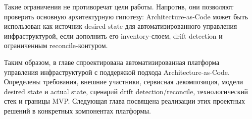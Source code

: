 Такие ограничения не противоречат цели работы. Напротив, они позволяют проверить основную архитектурную гипотезу: Architecture-as-Code может быть использован как источник desired state для автоматизированного управления инфраструктурой, если дополнить его inventory-слоем, drift detection и ограниченным reconcile-контуром.

Таким образом, в главе спроектирована автоматизированная платформа управления инфраструктурой с поддержкой подхода Architecture-as-Code. Определены требования, внешние участники, сервисная декомпозиция, модели desired state и actual state, сценарий drift detection/reconcile, технологический стек и границы MVP. Следующая глава посвящена реализации этих проектных решений в конкретных компонентах платформы.
